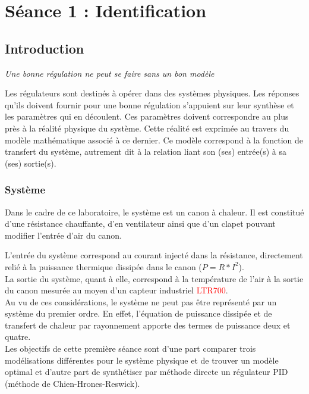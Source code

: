 \section{Séance 1 : Identification}
\subsection{Introduction}
\begin{center}
\textit{Une bonne régulation ne peut se faire sans un bon modèle}
\end{center}

Les régulateurs sont destinés à opérer dans des systèmes physiques. Les réponses qu'ils doivent fournir pour une bonne régulation s'appuient sur leur synthèse et les paramètres qui en découlent. Ces paramètres doivent correspondre au plus près à la réalité physique du système. Cette réalité est exprimée au travers du modèle mathématique associé à ce dernier. Ce modèle correspond à la fonction de transfert du système, autrement dit à la relation liant son (ses) entrée(s) à sa (ses) sortie(s).\\

\subsubsection{Système}
Dans le cadre de ce laboratoire, le système est un canon à chaleur. Il est constitué d'une résistance chauffante, d'en ventilateur ainsi que d'un clapet pouvant modifier l'entrée d'air du canon.


L'entrée du système correspond au courant injecté dans la résistance, directement relié à la puissance thermique dissipée dans le canon ($P = R*I^{2}$).\\
 
La sortie du système, quant à elle, correspond à la température de l'air à la sortie du canon mesurée au moyen d'un capteur industriel \textcolor{red}{LTR700}.\\ 

Au vu de ces considérations, le système ne peut pas être représenté par un système du premier ordre. En effet, l'équation de puissance dissipée et de transfert de chaleur par rayonnement apporte des termes de puissance deux et quatre.\\

Les objectifs de cette première séance sont d'une part comparer trois modélisations différentes pour le système physique et de trouver un modèle optimal et d'autre part de synthétiser par méthode directe un régulateur PID (méthode de Chien-Hrones-Reswick). 


